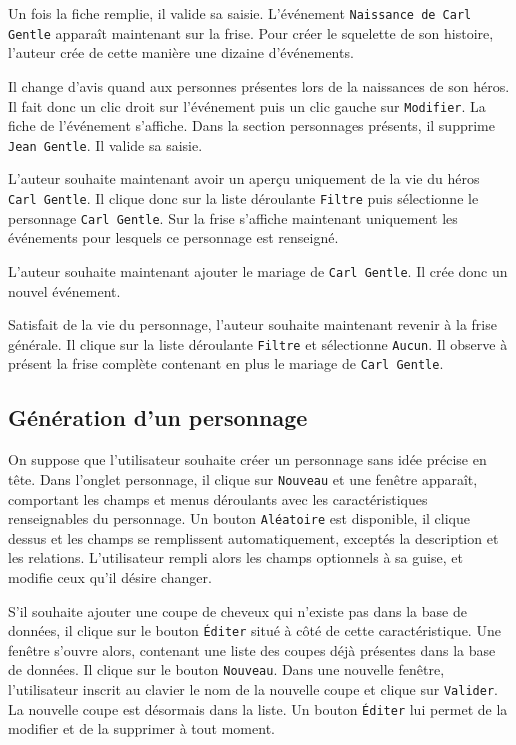 \documentclass[a4paper,11pt,twoside]{article}
\begin{document}
Un fois la fiche remplie, il valide sa saisie. L'événement \texttt{Naissance de Carl Gentle} apparaît maintenant sur la frise. Pour créer le squelette de son histoire, l'auteur crée de cette manière une dizaine d'événements.

Il change d'avis quand aux personnes présentes lors de la naissances de son héros. Il fait donc un clic droit sur l'événement puis un clic gauche sur \texttt{Modifier}. La fiche de l'événement s'affiche. Dans la section personnages présents, il supprime \texttt{Jean Gentle}. Il valide sa saisie.

L'auteur souhaite maintenant avoir un aperçu uniquement de la vie du héros \texttt{Carl Gentle}. Il clique donc sur la liste déroulante \texttt{Filtre} puis sélectionne le personnage \texttt{Carl Gentle}. Sur la frise s'affiche maintenant uniquement les événements pour lesquels ce personnage est renseigné.

L'auteur souhaite maintenant ajouter le mariage de \texttt{Carl Gentle}. Il crée donc un nouvel événement.

Satisfait de la vie du personnage, l'auteur souhaite maintenant revenir à la frise générale. Il clique sur la liste déroulante \texttt{Filtre} et sélectionne \texttt{Aucun}. Il observe à présent la frise complète contenant en plus le mariage de \texttt{Carl Gentle}.

\subsection{Génération d'un personnage}
On suppose que l'utilisateur souhaite créer un personnage sans idée précise en tête. Dans l'onglet personnage, il clique sur \texttt{Nouveau} et une fenêtre apparaît, comportant les champs et menus déroulants avec les caractéristiques renseignables du personnage. Un bouton \texttt{Aléatoire} est disponible, il clique dessus et les champs se remplissent automatiquement, exceptés la description et les relations. L'utilisateur rempli alors les champs optionnels à sa guise, et modifie ceux qu'il désire changer. 

S'il souhaite ajouter une coupe de cheveux qui n'existe pas dans la base de données, il clique sur le bouton \texttt{\'Editer} situé à côté de cette caractéristique. Une fenêtre s'ouvre alors, contenant une liste des coupes déjà présentes dans la base de données. Il clique sur le bouton \texttt{Nouveau}.  Dans une nouvelle fenêtre, l'utilisateur inscrit au clavier le nom de la nouvelle coupe et clique sur \texttt{Valider}. La nouvelle coupe est désormais dans la liste. Un bouton \texttt{\'Editer} lui permet de la modifier et de la supprimer à tout moment. 
\end{document}
